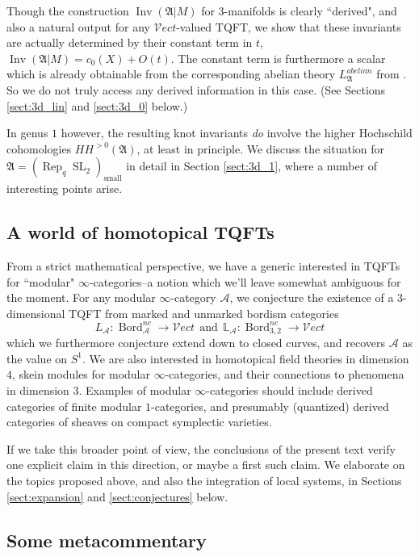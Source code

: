 \documentclass[reqno]{amsart}
\theoremstyle{definition}
\newcommand{\mfk}[1]{\mathfrak{#1}}
\newcommand{\mbb}[1]{\mathbb{#1}}
\newcommand{\msc}[1]{\mathscr{#1}}
\newcommand{\opn}[1]{\operatorname{#1}}
\newcommand{\Vect}{\msc{V}\!ect}
\DeclareMathOperator{\Rep}{Rep}
\DeclareMathOperator{\Bord}{Bord}
\renewcommand{\1}{\mathbf{1}}
\begin{document}
Though the construction $\opn{Inv}(\mfk{A}|M)$ for $3$-manifolds is clearly ``derived", and also a natural output for any $\Vect$-valued TQFT, we show that these invariants are actually determined by their constant term in $t$, $\opn{Inv}(\mfk{A}|M)=c_0(X)+O(t)$.  The constant term is furthermore a scalar which is already obtainable from the corresponding abelian theory $L^{abelian}_{\mfk{A}}$ from \cite{derenzietal23}.  So we do not truly access any derived information in this case. (See Sections \ref{sect:3d_lin} and \ref{sect:3d_0} below.)
\par

In genus $1$ however, the resulting knot invariants \emph{do} involve the higher Hochschild cohomologies $HH^{>0}(\mfk{A})$, at least in principle. We discuss the situation for $\mfk{A}=(\Rep_q\opn{SL}_2)_{\opn{small}}$ in detail in Section \ref{sect:3d_1}, where a number of interesting points arise.


\subsection{A world of homotopical TQFTs}

From a strict mathematical perspective, we have a generic interested in TQFTs for ``modular" $\infty$-categories--a notion which we'll leave somewhat ambiguous for the moment. For any modular $\infty$-category $\msc{A}$, we conjecture the existence of a $3$-dimensional TQFT from marked and unmarked bordism categories
\[
L_{\msc{A}}:\Bord^{nc}_{\msc{A}}\to \Vect\ \ \text{and}\ \ \mbb{L}_{\msc{A}}:\Bord^{nc}_{3,2}\to \Vect
\]
which we furthermore conjecture extend down to closed curves, and recovers $\msc{A}$ as the value on $S^1$. We are also interested in homotopical field theories in dimension $4$, skein modules for modular $\infty$-categories, and their connections to phenomena in dimension $3$. Examples of modular $\infty$-categories should include derived categories of finite modular $1$-categories, and presumably (quantized) derived categories of sheaves on compact symplectic varieties.
\par

If we take this broader point of view, the conclusions of the present text verify one explicit claim in this direction, or maybe a first such claim. We elaborate on the topics proposed above, and also the integration of local systems, in Sections \ref{sect:expansion} and \ref{sect:conjectures} below.

\subsection{Some metacommentary}
\end{document}
